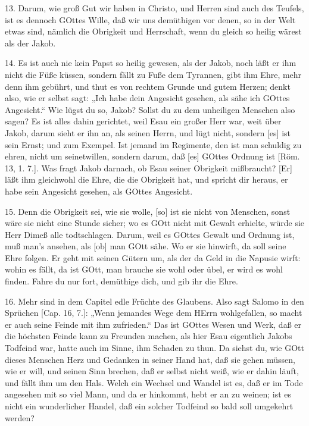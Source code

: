 13. Darum, wie groß Gut wir haben in Christo, und Herren sind auch des Teufels, ist es dennoch GOttes Wille, daß wir uns demüthigen vor denen, so in der Welt etwas sind,
nämlich die Obrigkeit und Herrschaft, wenn du gleich so heilig wärest als der Jakob.

14. Es ist auch nie kein Papst so heilig gewesen, als der Jakob, noch läßt er ihm nicht die Füße küssen, sondern fällt zu Fuße dem Tyrannen, gibt ihm Ehre, mehr denn ihm gebührt, und thut es von rechtem Grunde und gutem Herzen; denkt also, wie er selbst sagt: „Ich habe dein Angesicht gesehen, als sähe ich GOttes Angesicht.“ Wie lügst du so, Jakob? Sollst du zu dem unheiligen Menschen also sagen? Es ist alles dahin gerichtet, weil Esau ein großer Herr war, weit über Jakob, darum sieht er ihn an, als seinen Herrn, und lügt nicht, sondern [es] ist sein Ernst; und zum Exempel. Ist jemand im Regimente, den ist man schuldig zu ehren, nicht um seinetwillen, sondern darum, daß [es] GOttes Ordnung ist [Röm. 13, 1. 7.]. Was fragt Jakob darnach, ob Esau seiner Obrigkeit mißbraucht? [Er] läßt ihm gleichwohl die Ehre, die die Obrigkeit hat, und spricht dir heraus, er habe sein Angesicht gesehen, als GOttes Angesicht.

15. Denn die Obrigkeit sei, wie sie wolle, [so] ist sie nicht von Menschen, sonst wäre sie nicht eine Stunde sicher; wo es GOtt nicht mit Gewalt erhielte, würde sie Herr Dimeß alle todtschlagen. Darum, weil es GOttes Gewalt und Ordnung ist, muß man’s ansehen, als [ob] man GOtt sähe. Wo er sie hinwirft, da soll seine Ehre folgen. Er geht mit seinen Gütern um, als der da Geld in die Napusie wirft: wohin es fällt, da ist GOtt, man brauche sie wohl oder übel, er wird es wohl finden. Fahre du nur fort, demüthige dich, und gib ihr die Ehre.

16. Mehr sind in dem Capitel edle Früchte des Glaubens. Also sagt Salomo in den Sprüchen [Cap. 16, 7.]: „Wenn jemandes Wege dem HErrn wohlgefallen, so macht er auch seine Feinde mit ihm zufrieden.“ Das ist GOttes Wesen und Werk, daß er die höchsten Feinde kann zu Freunden machen, als hier Esau eigentlich Jakobs Todfeind war, hatte auch im Sinne, ihm Schaden zu thun. Da siehst du, wie GOtt dieses Menschen Herz und Gedanken in seiner Hand hat, daß sie gehen müssen, wie er will, und seinen Sinn brechen, daß er selbst nicht weiß, wie er dahin läuft, und fällt ihm um den Hals. Welch ein Wechsel und Wandel ist es, daß er im Tode angesehen mit so viel Mann, und da er hinkommt, hebt er an zu weinen; ist es nicht ein wunderlicher Handel, daß ein solcher Todfeind so bald soll umgekehrt werden?

